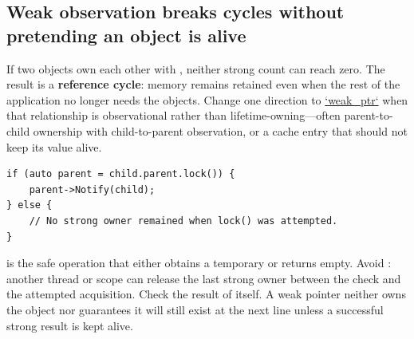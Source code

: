 \subsection{Weak observation breaks cycles without pretending an object is alive}\label{01-foundations-i-ch004-weak-observation-breaks-cycles-without-pretending-an-object-is-alive}

\hypertarget{01-foundations-i-ch004-weak-observation-breaks-cycles-without-pretending-an-object-is-alive}{}

If two objects own each other with , neither strong count can reach zero. The result is a \textbf{reference cycle}: memory remains retained even when the rest of the application no longer needs the objects. Change one direction to \hyperref[appendix-b9548675eb2b]{`weak\_ptr`} when that relationship is observational rather than lifetime-owning---often parent-to-child ownership with child-to-parent observation, or a cache entry that should not keep its value alive.

\begin{verbatim}
if (auto parent = child.parent.lock()) {
    parent->Notify(child);
} else {
    // No strong owner remained when lock() was attempted.
}
\end{verbatim}

 is the safe operation that either obtains a temporary  or returns empty. Avoid : another thread or scope can release the last strong owner between the check and the attempted acquisition. Check the result of  itself. A weak pointer neither owns the object nor guarantees it will still exist at the next line unless a successful strong result is kept alive.

